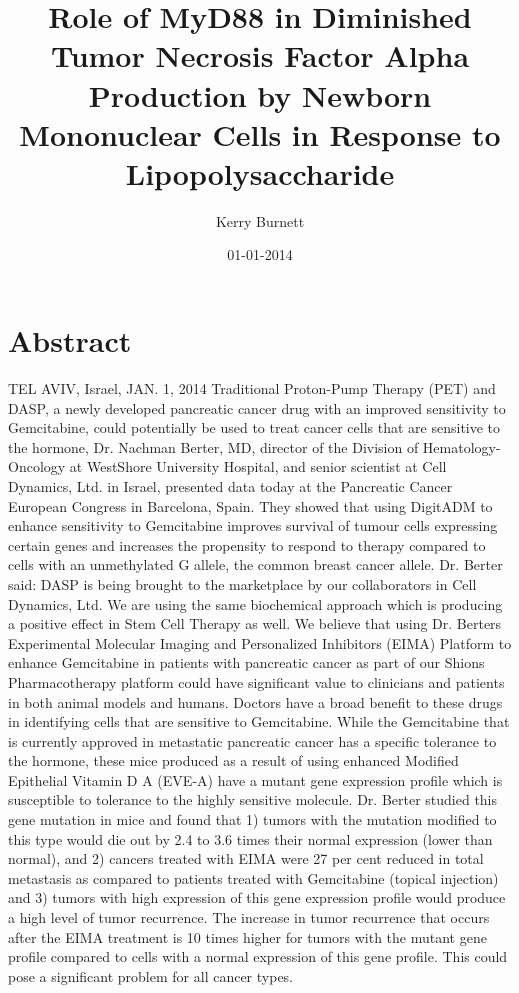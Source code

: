 \documentclass{article}%
\title{Role of MyD88 in Diminished Tumor Necrosis Factor Alpha Production by Newborn Mononuclear Cells in Response to Lipopolysaccharide}%
\author{Kerry Burnett}%
\affil{School of Pharmacy, China Medical University, 91 Hsueh{-}Shih Road, Taichung 404, Taiwan}%
\date{01{-}01{-}2014}%
\begin{document}
%
\normalsize%
\maketitle%
\section{Abstract}%
\label{sec:Abstract}%
TEL AVIV, Israel, JAN. 1, 2014  Traditional Proton{-}Pump Therapy (PET) and DASP, a newly developed pancreatic cancer drug with an improved sensitivity to Gemcitabine, could potentially be used to treat cancer cells that are sensitive to the hormone, Dr. Nachman Berter, MD, director of the Division of Hematology{-}Oncology at WestShore University Hospital, and senior scientist at Cell Dynamics, Ltd. in Israel, presented data today at the Pancreatic Cancer European Congress in Barcelona, Spain. They showed that using DigitADM to enhance sensitivity to Gemcitabine improves survival of tumour cells expressing certain genes and increases the propensity to respond to therapy compared to cells with an unmethylated G allele, the common breast cancer allele.\newline%
Dr. Berter said: DASP is being brought to the marketplace by our collaborators in Cell Dynamics, Ltd. We are using the same biochemical approach which is producing a positive effect in Stem Cell Therapy as well. We believe that using Dr. Berters Experimental Molecular Imaging and Personalized Inhibitors (EIMA) Platform to enhance Gemcitabine in patients with pancreatic cancer as part of our Shions Pharmacotherapy platform could have significant value to clinicians and patients in both animal models and humans.\newline%
Doctors have a broad benefit to these drugs in identifying cells that are sensitive to Gemcitabine. While the Gemcitabine that is currently approved in metastatic pancreatic cancer has a specific tolerance to the hormone, these mice produced as a result of using enhanced Modified Epithelial Vitamin D A (EVE{-}A) have a mutant gene expression profile which is susceptible to tolerance to the highly sensitive molecule. Dr. Berter studied this gene mutation in mice and found that 1) tumors with the mutation modified to this type would die out by 2.4 to 3.6 times their normal expression (lower than normal), and 2) cancers treated with EIMA were 27 per cent reduced in total metastasis as compared to patients treated with Gemcitabine (topical injection) and 3) tumors with high expression of this gene expression profile would produce a high level of tumor recurrence. The increase in tumor recurrence that occurs after the EIMA treatment is 10 times higher for tumors with the mutant gene profile compared to cells with a normal expression of this gene profile. This could pose a significant problem for all cancer types.\newline%
\end{document}
